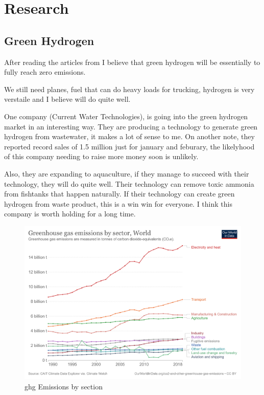 \chapter{Research}

\section{Green Hydrogen}
After reading the articles from \cite{goldman_sachs_hydrogen_2022} I believe that green hydrogen will be essentially to fully reach zero emissions.

We still need planes, fuel that can do heavy loads for trucking, hydrogen is very verstaile and I believe will do quite well.

One company  (Current Water Technologies), is going into the green hydrogen market in an interesting way. They are producing a technology to generate green hydrogen from wastewater, it makes a lot of sense to me. On another note, they reported record sales of 1.5 million just for january and feburary, the likelyhood of this company needing to raise more money soon is unlikely.

Also, they are expanding to aquaculture, if they manage to succeed with their technology, they will do quite well. Their technology can remove toxic ammonia from fishtanks that happen naturally. If their technology can create green hydrogen from waste product, this is a win win for everyone. I think this company is worth holding for a long time.


\begin{figure}[h]
\includegraphics[width=\textwidth]{src/media/ghg-emissions-by-sector.png}
\caption{ghg Emissions by section}
\end{figure}

